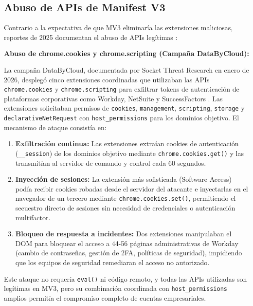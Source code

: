 \documentclass[12pt,oneside]{report}
\begin{document}
\subsection{Abuso de APIs de Manifest V3}

Contrario a la expectativa de que MV3 eliminaría las extensiones maliciosas, reportes de 2025 documentan el abuso de APIs legítimas \cite{seetharam2025genai}:

\textbf{Abuso de chrome.cookies y chrome.scripting (Campaña DataByCloud):}

La campaña DataByCloud, documentada por Socket Threat Research en enero de 2026, desplegó cinco extensiones coordinadas que utilizaban las APIs \texttt{chrome.cookies} y \texttt{chrome.scripting} para exfiltrar tokens de autenticación de plataformas corporativas como Workday, NetSuite y SuccessFactors \cite{pandya2026databycloud}. Las extensiones solicitaban permisos de \texttt{cookies}, \texttt{management}, \texttt{scripting}, \texttt{storage} y \texttt{declarativeNetRequest} con \texttt{host\_permissions} para los dominios objetivo. El mecanismo de ataque consistía en:

\begin{enumerate}
    \item \textbf{Exfiltración continua:} Las extensiones extraían cookies de autenticación (\texttt{\_\_session}) de los dominios objetivo mediante \texttt{chrome.cookies.get()} y las transmitían al servidor de comando y control cada 60 segundos.
    \item \textbf{Inyección de sesiones:} La extensión más sofisticada (Software Access) podía recibir cookies robadas desde el servidor del atacante e inyectarlas en el navegador de un tercero mediante \texttt{chrome.cookies.set()}, permitiendo el secuestro directo de sesiones sin necesidad de credenciales o autenticación multifactor.
    \item \textbf{Bloqueo de respuesta a incidentes:} Dos extensiones manipulaban el DOM para bloquear el acceso a 44-56 páginas administrativas de Workday (cambio de contraseñas, gestión de 2FA, políticas de seguridad), impidiendo que los equipos de seguridad remediaran el acceso no autorizado.
\end{enumerate}

Este ataque no requería \texttt{eval()} ni código remoto, y todas las APIs utilizadas son legítimas en MV3, pero su combinación coordinada con \texttt{host\_permissions} amplios permitía el compromiso completo de cuentas empresariales.
\end{document}
